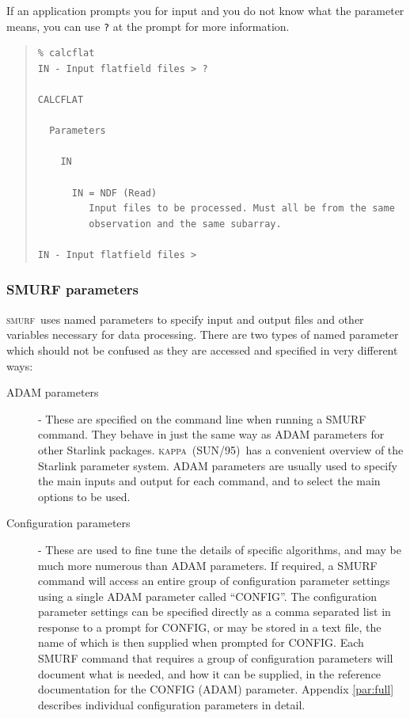 \documentclass[twoside,11pt]{article}
\newcommand{\xref}[3]{#1}
\renewcommand{\_}{\texttt{\symbol{95}}}
\newenvironment{myquote}{\begin{quote}\begin{small}}{\end{small}\end{quote}}
\newcommand{\KAPPA}{\textsc{kappa}}
\newcommand{\KAPPAref}{\xref{(SUN/95)}{sun95}{}}
\newcommand{\SMURF}{\textsc{smurf}}
\begin{document}
If an application prompts you for input and you do not know what the
parameter means, you can use \verb+?+ at the prompt for more
information.

\begin{myquote}
\begin{verbatim}
% calcflat
IN - Input flatfield files > ?

CALCFLAT

  Parameters

    IN

      IN = NDF (Read)
         Input files to be processed. Must all be from the same
         observation and the same subarray.

IN - Input flatfield files >
\end{verbatim}
\end{myquote}

\subsubsection{SMURF parameters}

\SMURF\ uses named parameters to specify input and output files and
other variables necessary for data processing. There are two types of
named parameter which should not be confused as they are accessed and
specified in very different ways:

\begin{description}
\item[ADAM parameters] - These are specified on the command line when
running a SMURF command. They behave in just the same way as ADAM
parameters for other Starlink packages. \KAPPA\ \KAPPAref\ has a
convenient overview of the Starlink parameter system. ADAM parameters are
usually used to specify the main inputs and output for each command, and
to select the main options to be used.
\item[Configuration parameters] - These are used to fine tune the details
of specific algorithms, and may be much more numerous than ADAM
parameters. If required, a SMURF command will access an entire group of
configuration parameter settings using a single ADAM parameter called
``CONFIG''. The configuration parameter settings can be specified
directly as a comma separated list in response to a prompt for CONFIG, or
may be stored in a text file, the name of which is then supplied when
prompted for CONFIG. Each SMURF command that requires a group of
configuration parameters will document what is needed, and how it can be
supplied, in the reference documentation for the CONFIG (ADAM) parameter.
Appendix \ref{par:full} describes individual configuration parameters in
detail.
\end{description}
\end{document}
